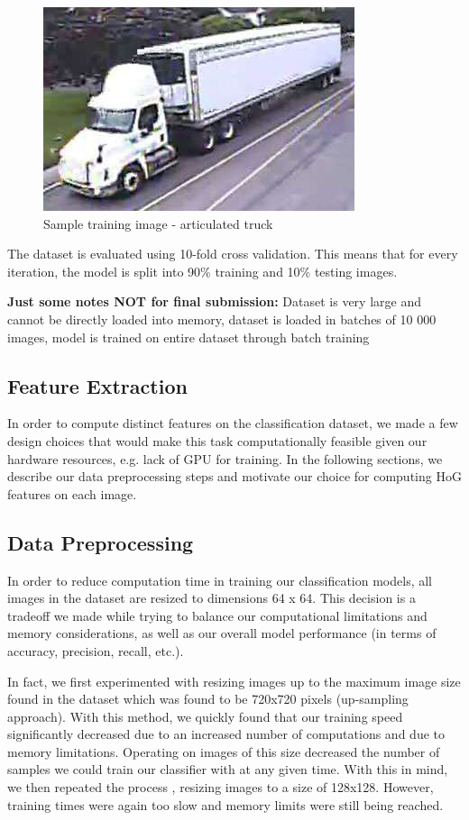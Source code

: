 \documentclass[12pt]{article}
\begin{document}
\begin{figure}[!htb]
    \centering
    \includegraphics{articulated_truck.jpg}
    \caption{Sample training image - articulated truck}
    \label{fig:articulated_truck}
\end{figure}

The dataset is evaluated using 10-fold cross validation. This means that for every iteration, the model is split into 90\% training and 10\% testing images. 

\textbf{Just some notes NOT for final submission: } Dataset is very large and cannot be directly loaded into memory, dataset is loaded in batches of 10 000 images, model is trained on entire dataset through batch training


\subsection{Feature Extraction}

In order to compute distinct features on the classification dataset, we made a few design choices that would make this task computationally feasible given our hardware resources, e.g. lack of GPU for training. In the following sections, we describe our data preprocessing steps and motivate our choice for computing HoG features on each image.

\subsection{Data Preprocessing}

In order to reduce computation time in training our classification models, all images in the dataset are resized to dimensions 64 x 64. This decision is a tradeoff we made while trying to balance our computational limitations and memory considerations, as well as our overall model performance (in terms of accuracy, precision, recall, etc.).

In fact, we first experimented with resizing images up to the maximum image size found in the dataset which was found to be 720x720 pixels (up-sampling approach). With this method, we quickly found that our training speed significantly decreased due to an increased number of computations and due to memory limitations. Operating on images of this size decreased the number of samples we could train our classifier with at any given time. With this in mind, we then repeated the process , resizing images to a size of 128x128. However, training times were again too slow and memory limits were still being reached. 
\end{document}
